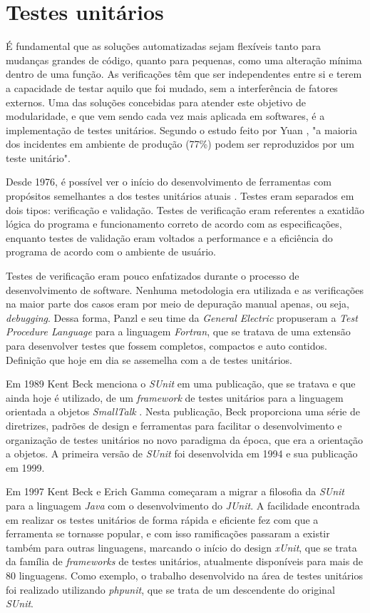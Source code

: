 \hypertarget{testes-unitarios}{%
\section{Testes unitários}\label{testes-unitarios}}

É fundamental que as soluções automatizadas sejam flexíveis tanto para mudanças grandes de código, quanto para pequenas, como uma alteração mínima dentro de uma função. As verificações têm que ser independentes entre si e terem a capacidade de testar aquilo que foi mudado, sem a interferência de fatores externos. Uma das soluções concebidas para atender este objetivo de modularidade, e que vem sendo cada vez mais aplicada em softwares, é a implementação de testes unitários. Segundo o estudo feito por Yuan \cite{yuan}, "a maioria dos incidentes em ambiente de produção (77\%) podem ser reproduzidos por um teste unitário".

Desde 1976, é possível ver o início do desenvolvimento de ferramentas com propósitos semelhantes a dos testes unitários atuais \cite{panzl}. Testes eram separados em dois tipos: verificação e validação. Testes de verificação eram referentes a exatidão lógica do programa e funcionamento correto de acordo com as especificações, enquanto testes de validação eram voltados a performance e a eficiência do programa de acordo com o ambiente de usuário.

Testes de verificação eram pouco enfatizados durante o processo de desenvolvimento de software. Nenhuma metodologia era utilizada e as verificações na maior parte dos casos eram por meio de depuração manual apenas, ou seja, \emph{debugging}. Dessa forma, Panzl e seu time da \emph{General Electric} propuseram a \emph{Test Procedure Language} para a linguagem \emph{Fortran}, que se tratava de uma extensão para desenvolver testes que fossem completos, compactos e auto contidos. Definição que hoje em dia se assemelha com a de testes unitários.

Em 1989 Kent Beck menciona o \emph{SUnit} em uma publicação, que se tratava e que ainda hoje é utilizado, de um \emph{framework} de testes unitários para a linguagem orientada a objetos \emph{SmallTalk} \cite{beck2}. Nesta publicação, Beck proporciona uma série de diretrizes, padrões de design e ferramentas para facilitar o desenvolvimento e organização de testes unitários no novo paradigma da época, que era a orientação a objetos. A primeira versão de \emph{SUnit} foi desenvolvida em 1994 e sua publicação em 1999.

Em 1997 Kent Beck e Erich Gamma começaram a migrar a filosofia da \emph{SUnit} para a linguagem \emph{Java} com o desenvolvimento do \emph{JUnit}. A facilidade encontrada em realizar os testes unitários de forma rápida e eficiente fez com que a ferramenta se tornasse popular, e com isso ramificações passaram a existir também para outras linguagens, marcando o início do design \emph{xUnit}, que se trata da família de \emph{frameworks} de testes unitários, atualmente disponíveis para mais de 80 linguagens. Como exemplo, o trabalho desenvolvido na área de testes unitários foi realizado utilizando \emph{phpunit}, que se trata de um descendente do original \emph{SUnit}.


